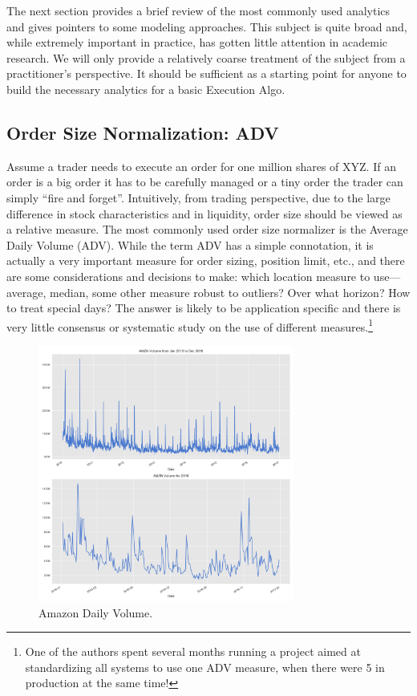 The next section provides a brief review of the most commonly used analytics and gives pointers to some modeling approaches. This subject is quite broad and, while extremely important in practice, has gotten little attention in academic research. We will only provide a relatively coarse treatment of the subject from a practitioner's perspective. It should be sufficient as a starting point for anyone to build  the necessary analytics for a basic Execution Algo.



\subsection{Order Size Normalization: ADV}

Assume a trader needs to execute an order for one million shares of XYZ. If an order is a big order it has to be carefully managed or a tiny order the trader can simply ``fire and forget''.  Intuitively, from trading perspective, due to  the large difference in stock characteristics and in liquidity, order size should be viewed as a relative measure. The most commonly used order size normalizer is the Average Daily Volume (ADV). While the term ADV has a simple connotation, it is actually a very important measure for order sizing, position limit, etc., and there are some considerations and decisions to make: which location measure to use---average, median, some other measure robust to outliers? Over what horizon? How to treat special days? The answer is likely to be application specific and there is very little consensus or systematic study on the use of different measures.\footnote{One of the authors spent several months running a project aimed at standardizing all systems to use one ADV measure, when there were 5 in production at the same time!}
 	
	\begin{figure}[!ht]
		\centering
			\includegraphics[width=0.75\textwidth]{chapters/chapter_trade_data_models/figures/daily_volume.png} 
		\caption{Amazon Daily Volume. \label{fig:daily_volume}}
	\end{figure}
	
